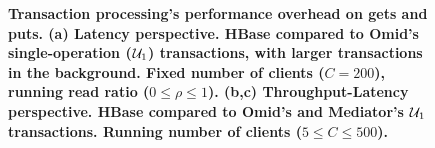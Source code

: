 \setlength{\abovecaptionskip}{7pt}
\setlength{\belowcaptionskip}{-2pt}
\begin{figure}[ht]

\caption{\bf{\small{Transaction processing's performance overhead on gets and puts. 
(a) Latency perspective. HBase compared to Omid's single-operation ($\mathcal{U}_{1}$) transactions, with larger transactions in the background. 
Fixed number of clients ($C=200$), running read ratio ($0 \leq \rho \leq 1$).
(b,c) Throughput-Latency perspective. HBase compared to Omid's and Mediator's $\mathcal{U}_{1}$ transactions. 
Running number of clients ($5 \leq C \leq 500$).} }}

\label{fig:txn_only_si}
\end{figure}

